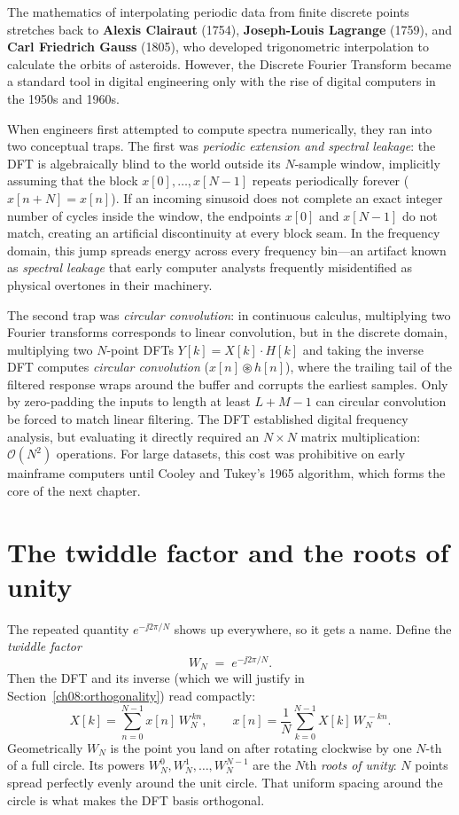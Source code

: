 \begin{historybox}
The mathematics of interpolating periodic data from finite discrete points stretches back to
\textbf{Alexis Clairaut} (1754), \textbf{Joseph-Louis Lagrange} (1759), and \textbf{Carl Friedrich
Gauss} (1805), who developed trigonometric interpolation to calculate the orbits of asteroids.
However, the Discrete Fourier Transform became a standard tool in digital engineering
only with the rise of digital computers in the 1950s and 1960s.

When engineers first attempted to compute spectra numerically, they ran into two
conceptual traps. The first was \emph{periodic extension and spectral leakage}: the DFT is algebraically blind to the
world outside its $N$-sample window, implicitly assuming that the block $x[0],\dots,x[N-1]$
repeats periodically forever ($x[n+N] = x[n]$). If an incoming sinusoid does not complete an
exact integer number of cycles inside the window, the endpoints $x[0]$ and $x[N-1]$ do not match, creating an artificial discontinuity at every block seam. In the
frequency domain, this jump spreads energy across every frequency bin---an
artifact known as \emph{spectral leakage} that early computer analysts frequently misidentified
as physical overtones in their machinery.

The second trap was \emph{circular convolution}: in continuous calculus, multiplying two Fourier
transforms corresponds to linear convolution, but in the discrete domain, multiplying two $N$-point
DFTs $Y[k] = X[k]\cdot H[k]$ and taking the inverse DFT computes \emph{circular convolution} ($x[n] \circledast h[n]$),
where the trailing tail of the filtered response wraps around the buffer and corrupts the earliest
samples. Only by zero-padding the inputs to length at least $L+M-1$ can circular convolution be
forced to match linear filtering.
The DFT established digital frequency analysis, but evaluating it directly required an $N\times N$
matrix multiplication: $\mathcal{O}(N^2)$ operations. For large datasets, this cost
was prohibitive on early mainframe computers until Cooley and Tukey's 1965 algorithm, which forms the core of the
next chapter.
\end{historybox}

\section{The twiddle factor and the roots of unity}
\label{ch08:twiddle}

The repeated quantity $e^{-\jj 2\pi / N}$ shows up everywhere, so it gets a name.
Define the \emph{twiddle factor}
\[
W_N \;=\; e^{-\jj 2\pi / N}.
\]
Then the DFT and its inverse (which we will justify in
Section~\ref{ch08:orthogonality}) read compactly:
\[
X[k] = \sum_{n=0}^{N-1} x[n]\, W_N^{\,kn}, \qquad
x[n] = \frac{1}{N}\sum_{k=0}^{N-1} X[k]\, W_N^{\,-kn}.
\]
Geometrically $W_N$ is the point you land on after rotating clockwise by one
$N$-th of a full circle. Its powers $W_N^0, W_N^1, \dots, W_N^{N-1}$ are the $N$th
\emph{roots of unity}: $N$ points spread perfectly evenly around the unit circle.
That uniform spacing around the circle is what makes the DFT basis orthogonal.

